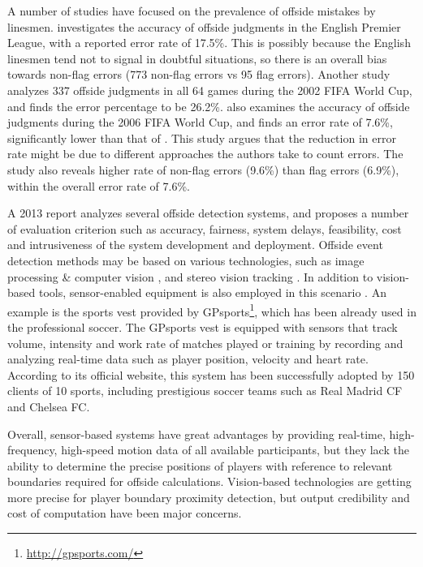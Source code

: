 A number of studies have focused on the prevalence of offside mistakes by linesmen. 
\cite{catteeuw2010offside} investigates the accuracy of offside judgments in the English Premier League, with a reported error rate of 17.5\%. This is possibly because the English linesmen tend not to signal in doubtful situations, so there is an overall bias towards non-flag errors (773 non-flag errors vs 95 flag errors).
Another study \cite{helsen2006errors} analyzes 337 offside judgments in all 64 games during the 2002 FIFA World Cup, and finds the error percentage to be 26.2\%.
\cite{catteeuw2010offside} also examines the accuracy of offside judgments during the 2006 FIFA World Cup, and finds an error rate of 7.6\%, significantly lower than that of \cite{helsen2006errors}.
This study argues that the reduction in error rate might be due to different approaches the authors take to count errors.
The study also reveals higher rate of non-flag errors (9.6\%) than flag errors (6.9\%), within the overall error rate of 7.6\%.

A 2013 report \cite{fowler2010feasible} analyzes several offside detection systems, and proposes a number of evaluation criterion such as accuracy, fairness, system delays, feasibility, cost and intrusiveness of the system development and deployment.
Offside event detection methods may be based on various technologies, such as image processing \& computer vision \cite{naidoo2006soccer}, and stereo vision tracking  \cite{borg2007detecting}.
In addition to vision-based tools, sensor-enabled equipment is also employed in this scenario \cite{regan2013sports} \cite{garcia2011wireless}.
An example is the sports vest provided by GPsports\footnote{\url{http://gpsports.com/}}, which has been already used in the professional soccer.
The GPsports vest is equipped with sensors that track volume, intensity and work rate of matches played or training by recording and analyzing real-time data such as player position, velocity and heart rate.
According to its official website, this system has been successfully adopted by 150 clients of 10 sports, including prestigious soccer teams such as Real Madrid CF and Chelsea FC.

Overall, sensor-based systems have great advantages by providing real-time, high-frequency, high-speed motion data of all available participants, but they lack the ability to determine the precise positions of players with reference to relevant boundaries required for offside calculations. 
Vision-based technologies are getting more precise for player boundary proximity detection, but output credibility and cost of computation have been major concerns.

